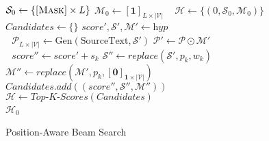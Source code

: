 \documentclass[11pt]{article}
\begin{document}
\begin{figure}
\centering
\begin{minipage}[h]{0.48\textwidth}
\begin{algorithm}[H]
\caption{Position-Aware Beam Search}\label{alg:Beam}
\begin{algorithmic}[1]
\smaller
{}\\
\Comment{\textcolor{darkblue}{$L$ is the summary length and $K$ is the beam size.}}
\State $\mathcal{S}_0 \gets \{\mbox{\textsc{[Mask]}}\times L\}$ \quad\Comment{\textcolor{darkblue}{Initial summary.}}
\State $\mathcal{M}_0 \gets [\mathbf{1}]_{L \times |\mathcal{V}|}$ \,\,\,\Comment{\textcolor{darkblue}{A binary mask of $L$ positions.}}
\State $\mathcal{H} \gets \{(0, \mathcal{S}_0, \mathcal{M}_0)\}$ \,\,\;\Comment{\textcolor{darkblue}{A priority queue.}}
    \State $\textit{Candidates} \gets \{\}$
        \State $\textit{score}', \mathcal{S}', \mathcal{M}' \gets \textit{hyp}$\\
        \quad\quad\quad\quad\,\,\Comment{\textcolor{darkblue}{Estimate token probabilities.}}
        \State $\mathcal{P}_{L \times |\mathcal{V}|} \gets \mbox{Gen}(\mbox{SourceText}, \mathcal{S}')$ 
        \State $\mathcal{P}' \gets \mathcal{P} \odot \mathcal{M}'$\\ \quad\quad\quad\quad\,\,\Comment{\textcolor{darkblue}{Record $K$-best tokens and positions.}}
            \State $\textit{score}'' \gets \textit{score}' + s_k$
            \State $\mathcal{S}'' \gets \textit{replace}(\mathcal{S}', p_k, w_k)$
            \State $\mathcal{M}'' \gets \textit{replace}(\mathcal{M}', p_k, [\mathbf{0}]_{\mathbf{1}\times|\mathcal{V}|})$
            \State $\textit{Candidates}.add((\textit{score}'', \mathcal{S}'', \mathcal{M}''))$
        \EndFor
    \EndFor
    \State $\mathcal{H} \gets \textit{Top-K-Scores}(\textit{Candidates})$
\EndFor\\
\Return $\mathcal{H}_0$ \,\,\Comment{\textcolor{darkblue}{The best summary of length $L$.}}
\EndProcedure
\end{algorithmic}
\label{alg:beam_search}
\end{algorithm}
\end{minipage}
\end{figure}
\end{document}
